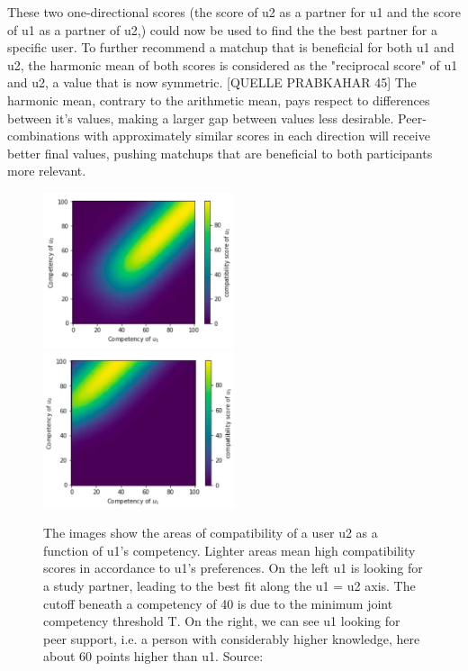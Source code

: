 \documentclass[nochapterpage,bigchapter,linedtoc,longdoc,colorback,accentcolor=tud3b]{tudreport}
\begin{document}
These two one-directional scores (the score of u2 as a partner for u1 and the score of u1 as a partner of u2,) could now be used to find the the best partner for a specific user. To further recommend a matchup that is beneficial for both u1 and u2, the harmonic mean of both scores is considered as the "reciprocal score" of u1 and u2, a value that is now symmetric. [QUELLE PRABKAHAR 45] The harmonic mean, contrary to the arithmetic mean, pays respect to differences between it's values, making a larger gap between values less desirable. Peer-combinations with approximately similar scores in each direction will receive better final values, pushing matchups that are beneficial to both participants more relevant.\\
\begin{figure}[h]
	\includegraphics[width=0.5\textwidth]{g/SeekingPartnerCompatibility.PNG}
	\includegraphics[width=0.5\textwidth]{g/SeekingSupportCompatibility.PNG}
	\caption{The images show the areas of compatibility of a user u2 as a function of u1's competency. Lighter areas mean high compatibility scores in accordance to u1's preferences. On the left u1 is looking for a study partner, leading to the best fit along the u1 = u2 axis. The cutoff beneath a competency of 40 is due to the minimum joint competency threshold T. On the right, we can see u1 looking for peer support, i.e. a person with considerably higher knowledge, here about 60 points higher than u1. Source: \cite{potts2018reciprocal}}
	\label{f:Seeking}
\end{figure}
\end{document}
